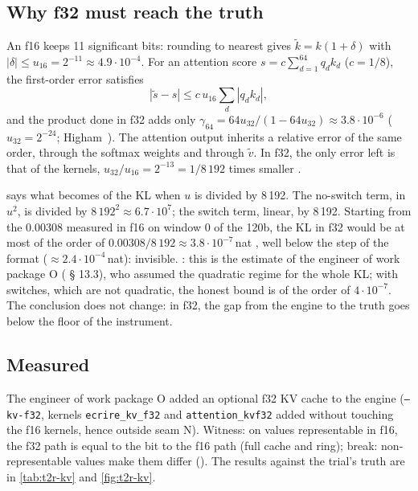\subsection{Why f32 must reach the truth}\label{sec:t2r-f32-theorie}

An f16 keeps 11 significant bits: rounding to nearest gives $\tilde k = k(1 + \delta)$ with $|\delta| \le u_{16} = 2^{-11} \approx 4.9\cdot10^{-4}$. For an attention score $s = c\sum_{d=1}^{64} q_d k_d$ ($c = 1/8$), the first-order error satisfies
\[
|\tilde s - s| \le c\, u_{16}\sum_d |q_d k_d|,
\]
and the product done in f32 adds only $\gamma_{64} = 64u_{32}/(1 - 64u_{32}) \approx 3.8\cdot10^{-6}$ ($u_{32} = 2^{-24}$; Higham~\cite{higham2002}). The attention output inherits a relative error of the same order, through the softmax weights and through $\tilde v$. In f32, the only error left is that of the kernels, $u_{32}/u_{16} = 2^{-13} = 1/8\,192$ times smaller \calc.

 says what becomes of the KL when $u$ is divided by 8\,192. The no-switch term, in $u^2$, is divided by $8\,192^2 \approx 6.7\cdot10^7$; the switch term, linear, by 8\,192. Starting from the 0.00308 measured in f16 on window 0 of the 120b, the KL in f32 would be at most of the order of $0.00308/8\,192 \approx 3.8\cdot10^{-7}$\,nat \calc, well below the step of the format ($\approx 2.4\cdot10^{-4}$\,nat): invisible. : this is the estimate of the engineer of work package O ( § 13.3), who assumed the quadratic regime for the whole KL; with switches, which are not quadratic, the honest bound is of the order of $4\cdot10^{-7}$. The conclusion does not change: in f32, the gap from the engine to the truth goes below the floor of the instrument.

\subsection{Measured}\label{sec:t2r-f32-mesure}

The engineer of work package O added an optional f32 KV cache to the engine (\texttt{--kv-f32}, kernels \texttt{ecrire\_kv\_f32} and \texttt{attention\_kvf32} added without touching the f16 kernels, hence outside seam N). Witness: on values representable in f16, the f32 path is equal to the bit to the f16 path (full cache and ring); break: non-representable values make them differ (). The results against the trial's truth are in \cref{tab:t2r-kv} and \cref{fig:t2r-kv}.

